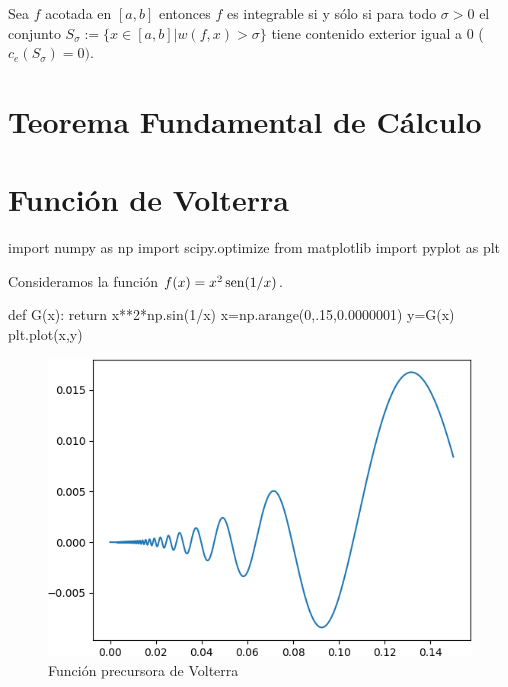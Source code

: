  \begin{teorema}  Sea $f$ acotada en $[a,b]$ entonces $f$ es integrable si y sólo si para todo $\sigma>0$ el conjunto $S_{\sigma}:=\{x\in [a,b]| w(f,x)>\sigma\}$ tiene contenido exterior igual a $0$ ($c_e(S_{\sigma})=0)$.
   \end{teorema}


\section{Teorema Fundamental de Cálculo}


\section{Función de Volterra}

\begin{pyblock}
import numpy as np
import scipy.optimize
from matplotlib import pyplot as plt
\end{pyblock}

Consideramos  la función $f(x)=x^2\operatorname{sen}(1/x)$. 

\begin{pyblock}
def G(x):
    return x**2*np.sin(1/x)
x=np.arange(0,.15,0.0000001)
y=G(x)
plt.plot(x,y)
\end{pyblock}


 \begin{figure}[h]
 \begin{center}
 \includegraphics[scale=0.5]{imagenes/VolterraPrecursora.png}
 \caption{Función precursora de Volterra}
\end{center}
 \end{figure}





